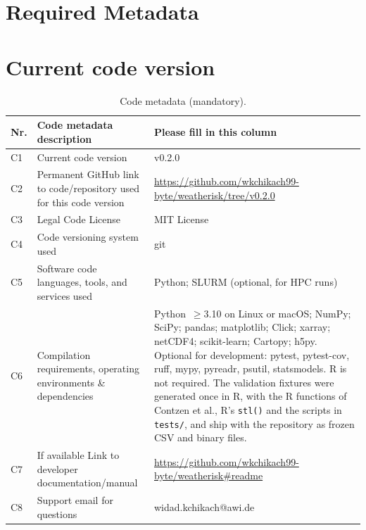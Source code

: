 \documentclass[preprint,12pt,a4paper]{elsarticle}
\begin{document}
\section*{Required Metadata}
\label{sec:metadata}

\section*{Current code version}

\begin{table}[H]
\small
\begin{tabularx}{\textwidth}{|l|>{\raggedright\arraybackslash}p{4.9cm}|>{\raggedright\arraybackslash}X|}
\hline
\textbf{Nr.} & \textbf{Code metadata description} & \textbf{Please fill in this column} \\
\hline
C1 & Current code version & v0.2.0 \\
\hline
C2 & Permanent GitHub link to code/repository used for this code version &
  \url{https://github.com/wkchikach99-byte/weatherisk/tree/v0.2.0} \\
\hline
C3 & Legal Code License & MIT License \\
\hline
C4 & Code versioning system used & git \\
\hline
C5 & Software code languages, tools, and services used &
  Python; SLURM (optional, for HPC runs) \\
\hline
C6 & Compilation requirements, operating environments
  \& dependencies &
  Python~$\geq$3.10 on Linux or macOS; NumPy; SciPy; pandas; matplotlib;
  Click; xarray; netCDF4; scikit-learn; Cartopy; h5py.
  Optional for development: pytest, pytest-cov, ruff, mypy, pyreadr,
  psutil, statsmodels. R is not required. The validation fixtures
  were generated once in R, with the R functions of Contzen
  et al., R's \texttt{stl()} and the scripts in
  \texttt{tests/}, and ship with the repository as frozen CSV and
  binary files. \\
\hline
C7 & If available Link to developer documentation/manual &
  \url{https://github.com/wkchikach99-byte/weatherisk\#readme} \\
\hline
C8 & Support email for questions & widad.kchikach@awi.de \\
\hline
\end{tabularx}
\caption{Code metadata (mandatory).}
\label{tab:metadata}
\end{table}
\end{document}
